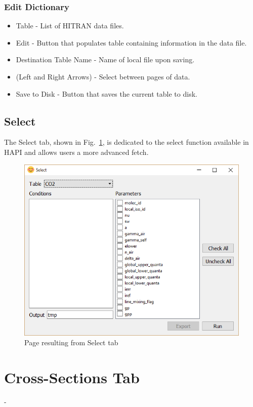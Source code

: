 \documentclass[12pt]{article}
\begin{document}
\subsubsection*{Edit Dictionary}
\begin{itemize}
\item Table - List of HITRAN data files.
\item Edit - Button that populates table containing information in the data file.
\item Destination Table Name - Name of local file upon saving.
\item (Left and Right Arrows) - Select between pages of data.
\item Save to Disk - Button that saves the  current table to disk.
\end{itemize}
\newpage


\subsection{Select}
The Select tab, shown in Fig.~\ref{fig:select}, is dedicated to the select function available in HAPI and allows users a more advanced fetch.
\begin{figure}[h]
\centering
\includegraphics[scale = 0.6]{select_window.png}
\caption{Page resulting from Select tab}
\label{fig:select}
\end{figure}

\section{Cross-Sections Tab}
-
\end{document}
